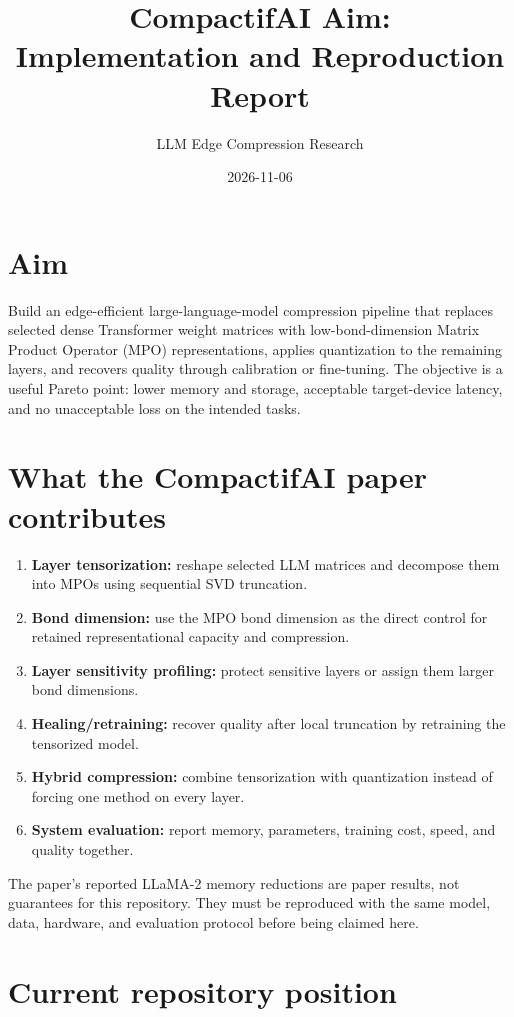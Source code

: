 \documentclass[11pt,a4paper]{article}
\title{CompactifAI Aim:\\Implementation and Reproduction Report}
\author{LLM Edge Compression Research}
\date{2026-11-06}
\begin{document}
\maketitle

\section{Aim}

Build an edge-efficient large-language-model compression pipeline that
replaces selected dense Transformer weight matrices with low-bond-dimension
Matrix Product Operator (MPO) representations, applies quantization to the
remaining layers, and recovers quality through calibration or fine-tuning.
The objective is a useful Pareto point: lower memory and storage, acceptable
target-device latency, and no unacceptable loss on the intended tasks.

\section{What the CompactifAI paper contributes}

\begin{enumerate}[leftmargin=*]
  \item \textbf{Layer tensorization:} reshape selected LLM matrices and
    decompose them into MPOs using sequential SVD truncation.
  \item \textbf{Bond dimension:} use the MPO bond dimension as the direct
    control for retained representational capacity and compression.
  \item \textbf{Layer sensitivity profiling:} protect sensitive layers or
    assign them larger bond dimensions.
  \item \textbf{Healing/retraining:} recover quality after local truncation by
    retraining the tensorized model.
  \item \textbf{Hybrid compression:} combine tensorization with quantization
    instead of forcing one method on every layer.
  \item \textbf{System evaluation:} report memory, parameters, training cost,
    speed, and quality together.
\end{enumerate}

The paper's reported LLaMA-2 memory reductions are paper results, not
guarantees for this repository. They must be reproduced with the same model,
data, hardware, and evaluation protocol before being claimed here.

\section{Current repository position}
\end{document}
